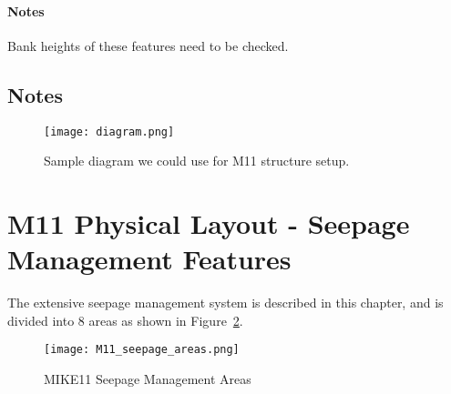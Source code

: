 \begin{notes}
\paragraph{Notes}
Bank heights of these features need to be checked.
\end{notes}



\clearpage

\begin{notes}

\subsection{Notes}

\begin{figure}[!h]
  \begin{center}
  \texttt{[image: diagram.png]}
  \caption{Sample diagram we could use for M11 structure setup.}
  \label{fig:diagram}
  \end{center}
\end{figure}

\end{notes}

\cleardoublepage


\section{M11 Physical Layout - Seepage Management Features}
\label{sec:seepagefeatures}


The extensive seepage management system is described in this chapter, and is divided into 8 areas as shown in Figure~\ref{fig:M11_seepage_areas}.

\begin{figure}[!h]
  \begin{center}
  \texttt{[image: M11\_seepage\_areas.png]}
  \caption[MIKE11 Seepage Management Areas]{MIKE11 Seepage Management Areas}
  \label{fig:M11_seepage_areas}
  \end{center}
\end{figure}

